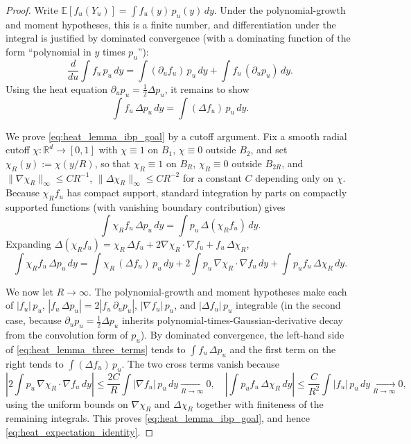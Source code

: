 \documentclass[11pt]{article}
\def\E{\mathbb{E}}
\def\R{\mathbb{R}}
\newcommand{\norm}[1]{\|#1\|}
\begin{document}
\begin{proof}
Write \(\E[f_u(Y_u)]=\int f_u(y)\,p_u(y)\,dy\). Under the polynomial-growth and moment hypotheses, this is a finite number, and differentiation under the integral is justified by dominated convergence (with a dominating function of the form ``polynomial in \(y\) times \(p_u\)''):
\[
\frac{d}{du}\int f_u\,p_u\,dy
=
\int(\partial_u f_u)\,p_u\,dy
+
\int f_u\,(\partial_u p_u)\,dy.
\]
Using the heat equation \(\partial_u p_u=\tfrac12\Delta p_u\), it remains to show
\begin{equation}
\label{eq:heat_lemma_ibp_goal}
\int f_u\,\Delta p_u\,dy = \int (\Delta f_u)\,p_u\,dy.
\end{equation}

We prove \eqref{eq:heat_lemma_ibp_goal} by a cutoff argument. Fix a smooth radial cutoff \(\chi:\R^d\to[0,1]\) with \(\chi\equiv 1\) on \(B_1\), \(\chi\equiv 0\) outside \(B_2\), and set \(\chi_R(y):=\chi(y/R)\), so that \(\chi_R\equiv 1\) on \(B_R\), \(\chi_R\equiv 0\) outside \(B_{2R}\), and \(\norm{\nabla\chi_R}_\infty\le CR^{-1}\), \(\norm{\Delta\chi_R}_\infty\le CR^{-2}\) for a constant \(C\) depending only on \(\chi\). Because \(\chi_R f_u\) has compact support, standard integration by parts on compactly supported functions (with vanishing boundary contribution) gives
\[
\int \chi_R f_u\,\Delta p_u\,dy
=
\int p_u\,\Delta(\chi_R f_u)\,dy.
\]
Expanding \(\Delta(\chi_R f_u) = \chi_R\,\Delta f_u + 2\nabla\chi_R\cdot\nabla f_u + f_u\,\Delta\chi_R\),
\begin{equation}
\label{eq:heat_lemma_three_terms}
\int \chi_R f_u\,\Delta p_u\,dy
=
\int \chi_R\,(\Delta f_u)\,p_u\,dy
+
2\int p_u\,\nabla\chi_R\cdot\nabla f_u\,dy
+
\int p_u f_u\,\Delta\chi_R\,dy.
\end{equation}

We now let \(R\to\infty\). The polynomial-growth and moment hypotheses make each of \(|f_u|\,p_u\), \(|f_u\,\Delta p_u|=2|f_u\,\partial_u p_u|\), \(|\nabla f_u|\,p_u\), and \(|\Delta f_u|\,p_u\) integrable (in the second case, because \(\partial_u p_u=\tfrac12\Delta p_u\) inherits polynomial-times-Gaussian-derivative decay from the convolution form of \(p_u\)). By dominated convergence, the left-hand side of \eqref{eq:heat_lemma_three_terms} tends to \(\int f_u\,\Delta p_u\) and the first term on the right tends to \(\int (\Delta f_u)\,p_u\). The two cross terms vanish because
\[
\left|2\int p_u\,\nabla\chi_R\cdot\nabla f_u\,dy\right|
\le
\frac{2C}{R}\int |\nabla f_u|\,p_u\,dy \xrightarrow[R\to\infty]{}0,
\quad
\left|\int p_u f_u\,\Delta\chi_R\,dy\right|
\le
\frac{C}{R^2}\int |f_u|\,p_u\,dy \xrightarrow[R\to\infty]{}0,
\]
using the uniform bounds on \(\nabla\chi_R\) and \(\Delta\chi_R\) together with finiteness of the remaining integrals. This proves \eqref{eq:heat_lemma_ibp_goal}, and hence \eqref{eq:heat_expectation_identity}.
\end{proof}
\end{document}
